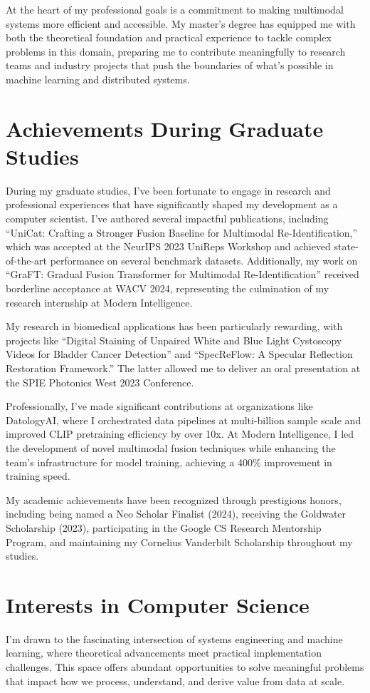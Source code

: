 \documentclass[12pt,letterpaper]{report}
\begin{document}
At the heart of my professional goals is a commitment to making multimodal systems more efficient and accessible. My master's degree has equipped me with both the theoretical foundation and practical experience to tackle complex problems in this domain, preparing me to contribute meaningfully to research teams and industry projects that push the boundaries of what's possible in machine learning and distributed systems.

\section{Achievements During Graduate Studies}
During my graduate studies, I've been fortunate to engage in research and professional experiences that have significantly shaped my development as a computer scientist. I've authored several impactful publications, including ``UniCat: Crafting a Stronger Fusion Baseline for Multimodal Re-Identification,'' which was accepted at the NeurIPS 2023 UniReps Workshop and achieved state-of-the-art performance on several benchmark datasets. Additionally, my work on ``GraFT: Gradual Fusion Transformer for Multimodal Re-Identification'' received borderline acceptance at WACV 2024, representing the culmination of my research internship at Modern Intelligence.

My research in biomedical applications has been particularly rewarding, with projects like ``Digital Staining of Unpaired White and Blue Light Cystoscopy Videos for Bladder Cancer Detection'' and ``SpecReFlow: A Specular Reflection Restoration Framework.'' The latter allowed me to deliver an oral presentation at the SPIE Photonics West 2023 Conference.

Professionally, I've made significant contributions at organizations like DatologyAI, where I orchestrated data pipelines at multi-billion sample scale and improved CLIP pretraining efficiency by over 10x. At Modern Intelligence, I led the development of novel multimodal fusion techniques while enhancing the team's infrastructure for model training, achieving a 400\% improvement in training speed.

My academic achievements have been recognized through prestigious honors, including being named a Neo Scholar Finalist (2024), receiving the Goldwater Scholarship (2023), participating in the Google CS Research Mentorship Program, and maintaining my Cornelius Vanderbilt Scholarship throughout my studies.

\section{Interests in Computer Science}
I'm drawn to the fascinating intersection of systems engineering and machine learning, where theoretical advancements meet practical implementation challenges. This space offers abundant opportunities to solve meaningful problems that impact how we process, understand, and derive value from data at scale.
\end{document}
